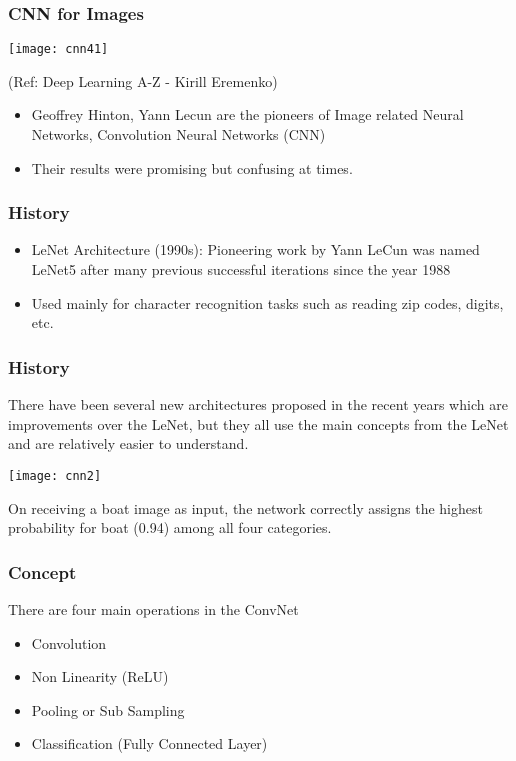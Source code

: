 \begin{frame}[fragile] \frametitle{CNN for Images}

\begin{center}
\texttt{[image: cnn41]}

\tiny{(Ref: Deep Learning A-Z - Kirill Eremenko)}
\end{center}

\begin{itemize}
\item Geoffrey Hinton, Yann Lecun are the pioneers of Image related Neural Networks, Convolution Neural Networks (CNN)
\item Their results were promising but confusing at times.
\end{itemize}


\end{frame}

\begin{frame}[fragile] \frametitle{History}


\begin{itemize}
\item LeNet Architecture (1990s): Pioneering work by Yann LeCun was named LeNet5 after many previous successful iterations since the year 1988 
\item Used mainly for character recognition tasks such as reading zip codes, digits, etc.

\end{itemize}
\end{frame}

\begin{frame}[fragile] \frametitle{History}
There have been several new architectures proposed in the recent years which are improvements over the LeNet, but they all use the main concepts from the LeNet and are relatively easier to understand.

\begin{center}
\texttt{[image: cnn2]}
\end{center}
On receiving a boat image as input, the network correctly assigns the highest probability for boat (0.94) among all four categories. 
\end{frame}

\begin{frame}[fragile] \frametitle{Concept}
There are four main operations in the ConvNet 

\begin{itemize}
\item Convolution
\item Non Linearity (ReLU)
\item Pooling or Sub Sampling
\item Classification (Fully Connected Layer)
\end{itemize}
\end{frame}



